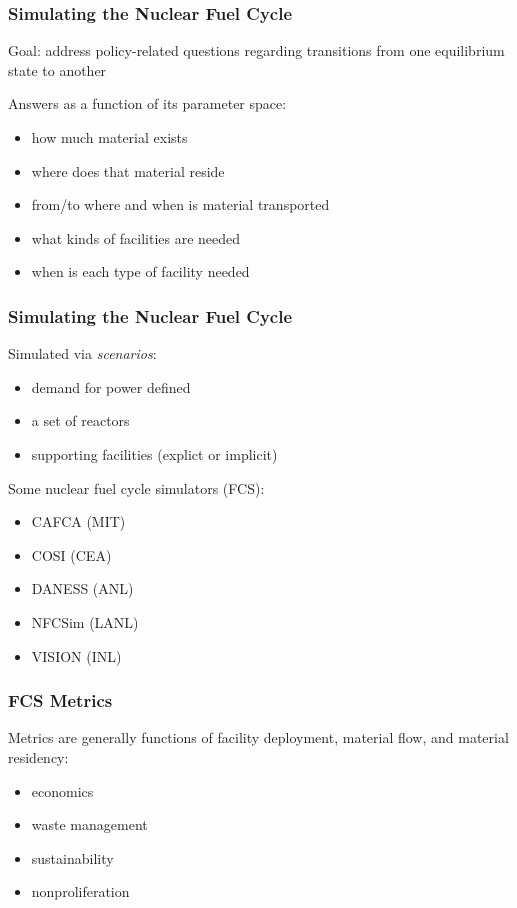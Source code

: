 
\begin{frame}[ctb!]
  \frametitle{Simulating the Nuclear Fuel Cycle} 

  Goal: address policy-related questions regarding transitions from one
  equilibrium state to another

  \vspace{0.2cm}
  
  Answers as a function of its parameter space:
  \begin{itemize}
    \item how much material exists
    \item where does that material reside
    \item from/to where and when is material transported
    \item what kinds of facilities are needed
    \item when is each type of facility needed
  \end{itemize}
\end{frame}

\begin{frame}[ctb!]
  \frametitle{Simulating the Nuclear Fuel Cycle}
  Simulated via \textit{scenarios}:
  \begin{itemize}
    \item demand for power defined
    \item a set of reactors
    \item supporting facilities (explict or implicit)
  \end{itemize}

  \vspace{0.2cm}
  
  Some nuclear fuel cycle simulators (FCS):
  \begin{itemize}
    \item CAFCA (MIT) \cite{busquim_e_silva_system_2008}
    \item COSI (CEA) \cite{boucher_cosi:_2006}
    \item DANESS (ANL) \cite{durpel_daness_2003}
    \item NFCSim (LANL) \cite{schneider_nfcsim:_2005}
    \item VISION (INL) \cite{yacout_vision_2006}
  \end{itemize}
\end{frame}

\begin{frame}[ctb!]
  \frametitle{FCS Metrics}

  Metrics are generally functions of facility deployment, material flow, and
  material residency:

  \begin{itemize}
    \item economics
    \item waste management
    \item sustainability
    \item nonproliferation
  \end{itemize}
\end{frame}


